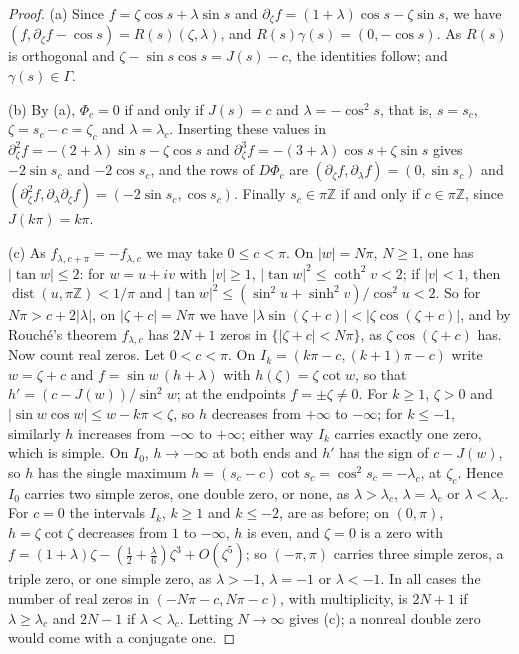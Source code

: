 \documentclass[11pt]{amsart}
\theoremstyle{definition}
\theoremstyle{remark}
\numberwithin{equation}{section}
\newcommand{\Z}{\mathbb{Z}}
\DeclareMathOperator{\dist}{dist}
\begin{document}
\begin{proof}
(a) Since $f=\zeta\cos s+\lambda\sin s$ and $\partial_\zeta f=(1+\lambda)\cos s-\zeta\sin s$, we have
$(f,\partial_\zeta f-\cos s)=R(s)(\zeta,\lambda)$, and $R(s)\gamma(s)=(0,-\cos s)$. As $R(s)$ is orthogonal and
$\zeta-\sin s\cos s=J(s)-c$, the identities follow; and $\gamma(s)\in\Gamma$.

(b) By (a), $\Phi_c=0$ if and only if $J(s)=c$ and $\lambda=-\cos^2s$, that is, $s=s_c$, $\zeta=s_c-c=\zeta_c$ and
$\lambda=\lambda_c$. Inserting these values in $\partial_\zeta^2f=-(2+\lambda)\sin s-\zeta\cos s$ and
$\partial_\zeta^3f=-(3+\lambda)\cos s+\zeta\sin s$ gives $-2\sin s_c$ and $-2\cos s_c$, and the rows of $D\Phi_c$ are
$(\partial_\zeta f,\partial_\lambda f)=(0,\sin s_c)$ and $(\partial_\zeta^2f,\partial_\lambda\partial_\zeta f)=(-2\sin s_c,\cos s_c)$.
Finally $s_c\in\pi\Z$ if and only if $c\in\pi\Z$, since $J(k\pi)=k\pi$.

(c) As $f_{\lambda,c+\pi}=-f_{\lambda,c}$ we may take $0\le c<\pi$. On $|w|=N\pi$, $N\ge1$, one has $|\tan w|\le2$:
for $w=u+iv$ with $|v|\ge1$, $|\tan w|^2\le\coth^2v<2$; if $|v|<1$, then $\dist(u,\pi\Z)<1/\pi$ and
$|\tan w|^2\le(\sin^2u+\sinh^2v)/\cos^2u<2$. So for $N\pi>c+2|\lambda|$, on $|\zeta+c|=N\pi$ we have
$|\lambda\sin(\zeta+c)|<|\zeta\cos(\zeta+c)|$, and by Rouch\'e's theorem $f_{\lambda,c}$ has $2N+1$ zeros in
$\{|\zeta+c|<N\pi\}$, as $\zeta\cos(\zeta+c)$ has. Now count real zeros. Let $0<c<\pi$. On
$I_k=(k\pi-c,(k+1)\pi-c)$ write $w=\zeta+c$ and $f=\sin w\,(h+\lambda)$ with $h(\zeta)=\zeta\cot w$, so that
$h'=(c-J(w))/\sin^2w$; at the endpoints $f=\pm\zeta\ne0$. For $k\ge1$, $\zeta>0$ and
$|\sin w\cos w|\le w-k\pi<\zeta$, so $h$ decreases from $+\infty$ to $-\infty$; for $k\le-1$, similarly $h$ increases from
$-\infty$ to $+\infty$; either way $I_k$ carries exactly one zero, which is simple. On $I_0$, $h\to-\infty$ at both ends
and $h'$ has the sign of $c-J(w)$, so $h$ has the single maximum $h=(s_c-c)\cot s_c=\cos^2s_c=-\lambda_c$, at $\zeta_c$.
Hence $I_0$ carries two simple zeros, one double zero, or none, as $\lambda>\lambda_c$, $\lambda=\lambda_c$ or
$\lambda<\lambda_c$. For $c=0$ the intervals $I_k$, $k\ge1$ and $k\le-2$, are as before; on $(0,\pi)$,
$h=\zeta\cot\zeta$ decreases from $1$ to $-\infty$, $h$ is even, and $\zeta=0$ is a zero with
$f=(1+\lambda)\zeta-(\frac12+\frac\lambda6)\zeta^3+O(\zeta^5)$; so $(-\pi,\pi)$ carries three simple zeros, a triple
zero, or one simple zero, as $\lambda>-1$, $\lambda=-1$ or $\lambda<-1$. In all cases the number of real zeros in
$(-N\pi-c,N\pi-c)$, with multiplicity, is $2N+1$ if $\lambda\ge\lambda_c$ and $2N-1$ if $\lambda<\lambda_c$. Letting
$N\to\infty$ gives (c); a nonreal double zero would come with a conjugate one.


\end{proof}
\end{document}
